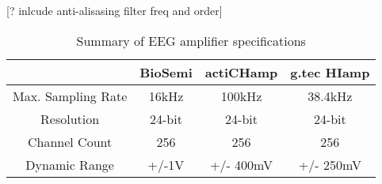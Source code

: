 \begin{table}[]
\centering
\caption{Summary of EEG amplifier specifications} [? inlcude anti-alisasing filter freq and order]
\label{tableeeg}
\begin{tabular}{|c|c|c|c|}
\hline
\textbf{}          & \textbf{BioSemi} & \textbf{actiCHamp} & \textbf{g.tec HIamp} \\ \hline
Max. Sampling Rate & 16kHz            & 100kHz             & 38.4kHz              \\ \hline
Resolution         & 24-bit           & 24-bit             & 24-bit               \\ \hline
Channel Count      & 256              & 256                & 256                  \\ \hline
Dynamic Range      & +/-1V            & +/- 400mV          & +/- 250mV            \\ \hline
\end{tabular}
\end{table}